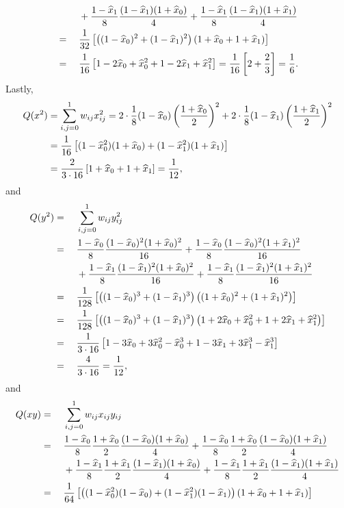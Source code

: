 \documentclass{homework}
\begin{document}
\begin{alphaparts}
\begin{alignat*}{2}
			&&& + \frac{1-\widehat{x}_1}{8}\frac{(1-\widehat{x}_1)(1+\widehat{x}_0)}{4} + \frac{1-\widehat{x}_1}{8}\frac{(1-\widehat{x}_1)(1+\widehat{x}_1)}{4} \\
			&{}={}&& \frac{1}{32}\left[\left((1-\widehat{x}_0)^2 + (1-\widehat{x}_1)^2\right)(1+\widehat{x}_0+1+\widehat{x}_1)\right] \\
			&{}={}&& \frac{1}{16}\left[1-2\widehat{x}_0 + \widehat{x}_0^2 + 1 - 2\widehat{x}_1 + \widehat{x}_1^2\right] = \frac{1}{16}\left[2 + \frac{2}{3}\right] = \frac{1}{6}.
		\end{alignat*}
		Lastly,
		\begin{align*}
			Q(x^2) &= \sum_{i,j=0}^1w_{ij}x_{ij}^2 = 2\cdot\frac{1}{8}(1-\widehat{x}_0)\left(\frac{1+\widehat{x}_0}{2}\right)^2 + 2\cdot\frac{1}{8}(1-\widehat{x}_1)\left(\frac{1+\widehat{x}_1}{2}\right)^2 \\ 
			&= \frac{1}{16}\left[(1-\widehat{x}_0^2)(1+\widehat{x}_0) + (1-\widehat{x}_1^2)(1+\widehat{x}_1)\right] \\
			&= \frac{2}{3\cdot16}\left[1+\widehat{x}_0 +1+\widehat{x}_1\right] = \frac{1}{12},
		\end{align*}
		and
		\begin{alignat*}{2}
			Q(y^2) &{}={} &&\sum_{i,j=0}^1w_{ij}y_{ij}^2\\
			&{}={}&&\frac{1-\widehat{x}_0}{8}\frac{(1-\widehat{x}_0)^2(1+\widehat{x}_0)^2}{16} + \frac{1-\widehat{x}_0}{8}\frac{(1-\widehat{x}_0)^2(1+\widehat{x}_1)^2}{16} \\
			&&& + \frac{1-\widehat{x}_1}{8}\frac{(1-\widehat{x}_1)^2(1+\widehat{x}_0)^2}{16} + \frac{1-\widehat{x}_1}{8}\frac{(1-\widehat{x}_1)^2(1+\widehat{x}_1)^2}{16} \\
			&{}={}&& \frac{1}{128}\left[\left((1-\widehat{x}_0)^3 + (1-\widehat{x}_1)^3\right)\left((1+\widehat{x}_0)^2 + (1+\widehat{x}_1)^2\right)\right] \\
			&{}={}&& \frac{1}{128}\left[\left((1-\widehat{x}_0)^3 + (1-\widehat{x}_1)^3\right)\left(1+2\widehat{x}_0+\widehat{x}_0^2 + 1+2\widehat{x}_1+\widehat{x}_1^2\right)\right] \\
			&{}={}&& \frac{1}{3\cdot 16}\left[1-3\widehat{x}_0 + 3\widehat{x}_0^2 -\widehat{x}_0^3 + 1 - 3\widehat{x}_1 + 3\widehat{x}_1^3 - \widehat{x}_1^3\right] \\
			&{}={}&& \frac{4}{3\cdot 16} = \frac{1}{12},
		\end{alignat*}
		and
		\begin{alignat*}{2}
			Q(xy) &{}={} &&\sum_{i,j=0}^1w_{ij}x_{ij}y_{ij}\\
			&{}={}&&\frac{1-\xh_0}{8}\frac{1+\xh_0}{2}\frac{(1-\xh_0)(1+\xh_0)}{4} + \frac{1-\xh_0}{8}\frac{1+\xh_0}{2}\frac{(1-\xh_0)(1+\xh_1)}{4} \\
			&&& + \frac{1-\xh_1}{8}\frac{1+\xh_1}{2}\frac{(1-\xh_1)(1+\xh_0)}{4} + \frac{1-\xh_1}{8}\frac{1+\xh_1}{2}\frac{(1-\xh_1)(1+\xh_1)}{4} \\
			&{}={}&& \frac{1}{64}\left[\left((1-\xh_0^2)(1-\xh_0) + (1-\xh_1^2)(1-\xh_1)\right)(1+\xh_0 +1+\xh_1)\right] \\

\end{alignat*}
\end{alphaparts}
\end{document}
